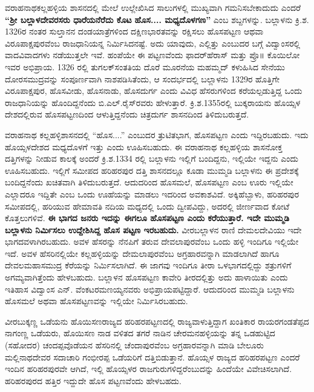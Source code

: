 \newpage

ವರಾಹನಾಥಕಲ್ಲಹಳ್ಳಿಯ ಶಾಸನದಲ್ಲಿ ಮೇಲೆ ಉಲ್ಲೇಖಿಸಿದ ಸಾಲುಗಳಲ್ಲಿ ಮುಖ್ಯವಾಗಿ ಗಮನಿಸಬೇಕಾದುದು ಎಂದರೆ \textbf{“ಶ‍್ರೀ ಬಲ್ಲಾಳದೇವರಸರು ಧಾರೆಯನೆರೆದು ಕೊಟ} \textbf{ಹೊಸ.... ಮಧ್ಯದೊಳಗಣ” }ಎಂಬ ಶಬ್ದಗಳನ್ನು. ಬಲ್ಲಾಳನು ಕ್ರಿ.ಶ. 1326ರ ನಂತರ ಸುಲ್ತಾನನ ದಂಡಯಾತ್ರೆಗಳಿಂದ ದಕ್ಷಿಣಭಾರತವನ್ನು ರಕ್ಷಿಸಲು ಹೊಸಪಟ್ಟಣ ಆಥವಾ ವಿರೂಪಾಕ್ಷಪುರ\-ವೆಂಬ ರಾಜಧಾನಿಯನ್ನ ನಿರ್ಮಿಸಿದನಷ್ಟೆ. ಅದು ಯಾವುದು, ಎಲ್ಲಿತ್ತು ಎಂಬುದರ ಬಗ್ಗೆ ವಿದ್ವಾಂಸರಲ್ಲಿ ವಾದವಿವಾದಗಳು ನಡೆಯುತ್ತಲೇ ಇವೆ. ಹಂಪೆಯೇ ಈ ಪಟ್ಟಣವೆಂದು ಫಾದರ್​ಹೆರಾಸ್​ ಮತ್ತು ಪ್ರೊ॥ ಕೊಯಿಲೋ ಇವರ ಅಭಿಪ್ರಾಯ. 1326 ರಲ್ಲಿ ತುಗಲಕ್​ ಸಂತತಿಯ ದೊರೆ ಮೂರನೆಯ ಮಹಮ್ಮದ್​ ಕಳುಹಿಸಿದ ಸೇನೆಯು ದೋರಸಮುದ್ರವನ್ನು ಸಂಪೂರ್ಣವಾಗಿ ನಾಶಪಡಿಸಿತೆಂದು, ಆ ಸಂದರ್ಭದಲ್ಲಿ ಬಲ್ಲಾಳನು 1329ರ ಹೊತ್ತಿಗೇ ವಿರೂಪಾಕ್ಷಪುರ, ಹೊಸವೀಡು, ಹೊಸನಾಡು, ಹೊಸದುರ್ಗ ಎಂದು ವಿವಿಧ ಹೆಸರುಗಳಿಂದ ಕರೆಯಲ್ಪಡುತ್ತಿದ್ದ ಒಂದು ರಾಜಧಾನಿಯನ್ನು ಹೊಂದಿದ್ದನೆಂದು ಬಿ.ಎಲ್​.ರೈಸ್​\-ರವರು ಹೇಳುತ್ತಾರೆ. ಕ್ರಿ.ಶ.1355ರಲ್ಲಿ ಬುಕ್ಕರಾಯನು ಹೊಯ್ಸಳ ದೇಶದಲ್ಲಿರುವ ಹೊಸಪಟ್ಟಣದಿಂದ ಆಳುತ್ತಿದ್ದನೆಂದು ಚಿತ್ರದುರ್ಗ ಶಾಸನದಿಂದ ತಿಳಿದುಬರುತ್ತದೆ.

ವರಾಹನಾಥ ಕಲ್ಲಹಳ್ಳಿಶಾಸನದಲ್ಲಿ “ಹೊಸ....” ಎಂಬುದರ ತ್ರುಟಿತಭಾಗ, ಹೊಸಪಟ್ಟಣ ಎಂದು ಇದ್ದಿರಬಹುದು. ಇದು ಹೊಯ್ಸಳದೇಶದ ಮಧ್ಯದೊಳಗೆ ಇತ್ತು ಎಂದು ಊಹಿಸಬಹುದು. ಈ ವರಾಹನಾಥ ಕಲ್ಲಹಳ್ಳಿಯ ಶಾಸನೋಕ್ತ ದತ್ತಿಗಳನ್ನು ನೀಡುವ ಕಾಲಕ್ಕೆ ಅಂದರೆ ಕ್ರಿ.ಶ.1334 ರಲ್ಲಿ ಬಲ್ಲಾಳನು ಇಲ್ಲಿಗೆ ಬಂದಿದ್ದನು, ಇಲ್ಲಿಯೇ ಇದ್ದನು ಎಂದು ಊಹಿಸಬಹುದು. ಇಲ್ಲಿಗೆ ಸಮೀಪದ ಹರಿಹರಪುರ ದತ್ತಿ ಶಾಸನದಲ್ಲೂ ಕೂಡಾ ಮುಮ್ಮಡಿ ಬಲ್ಲಾಳನು ಈ ಪ್ರದೇಶಕ್ಕೆ ಬಂದಿದ್ದನೆಂದು ಖಚಿತವಾಗಿ ತಿಳಿದುಬರುತ್ತದೆ. ಆದುದರಿಂದ ಹೊಸಮಲೆ, ಹೊಸಪಟ್ಟಣ ಎಂಬ ಊರು ಇಲ್ಲಿಯೇ ಎಲ್ಲಾದರೂ ಇದ್ದಿತೇ ಎಂಬ ಒಂದು ಊಹೆಯನ್ನು ಮಾಡಲು ಇದರಿಂದ ಅವಕಾಶವಿದೆ. ಅಕ್ಕಿಹೆಬ್ಬಾಳು, ಹರಿಹರಪುರ ಸಮೀಪದಲ್ಲಿ, ಹರಿಯುವ ಹೇಮಾವತಿ ನದಿಯ ಮಧ್ಯದಲ್ಲಿ ಒಂದು ದ್ವೀಪವಿದ್ದು, ಅದರಲ್ಲಿ ಜೀರ್ಣವಾದ ಕೋಟೆ ಕೊತ್ತಲುಗಳಿವೆ. \textbf{ಈ ಭಾಗದ ಜನರು ಇದನ್ನು ಈಗಲೂ ಹೊಸಪಟ್ಟಣ ಎಂದು ಕರೆಯುತ್ತಾರೆ. ಇದೇ ಮುಮ್ಮಡಿ ಬಲ್ಲಾಳನು ನಿರ್ಮಿಸಲು ಉದ್ದೇಶಿಸಿದ್ದ ಹೊಸ ಪಟ್ಟಣ ಇರಬಹುದು.} ವೀರಬಲ್ಲಾಳನ ರಾಣಿ ದೇಮಲದೇವಿಯು ಇದೇ ಭಾಗದವಳಾಗಿರಬಹುದು. ಅವಳ ಹೆಸರನ್ನು ನೆನಪಿಗೆ ತರುವ ದೇವಲಾಪುರವೆಂಬ ಒಂದು ಹಳ್ಳಿ ಇಂದಿಗೂ ಇಲ್ಲಿಯೇ ಇದೆ. ಅವಳ ಹೆಸರಿನಲ್ಲಿಯೇ ಕಲ್ಲಹಳ್ಳಿಯನ್ನು ದೇಮಲಾಪುರವೆಂಬ ಅಗ್ರಹಾರವನ್ನಾಗಿ ಮಾಡಲಾಗಿದೆ ಹಾಗೂ ದೇವಲಮಹಾಸಮುದ್ರ ಕೆರೆಯನ್ನು ನಿರ್ಮಿಸಲಾಗಿದೆ. ಈ ಜಾಗವು ಇಂದಿಗೂ ತೀರಾ ಒಳಭಾಗದಲ್ಲಿದ್ದು ಶತ್ರುಗಳಿಗೆ ಅಗಮ್ಯವಾಗಿತ್ತೆಂದು ಹೇಳಬಹುದು. ಬಲ್ಲಾಳನ ಹೊಸಪಟ್ಟಣ ಕಾವೇರಿ ತೀರದಲ್ಲಿತ್ತು ಅದು ಹಾಳಾಯಿತು ಎಂದು ಇತಿಹಾಸ ವಿದ್ವಾಂಸ ಎನ್​. ವೆಂಕಟರಮಣಯ್ಯನವರು ಅಭಿಪ್ರಾಯಪಟ್ಟಿದ್ದಾರೆ. ಆದುದರಿಂದ ಮುಮ್ಮಡಿ ಬಲ್ಲಾಳನು ಹೊಸಮಲೆ ಅಥವಾ ಹೊಸಪಟ್ಟಣವನ್ನು ಇಲ್ಲಿಯೇ ನಿರ್ಮಿಸಿರಬಹುದು.

ವೀರಬುಕ್ಕಣ್ಣ ಒಡೆಯನು ಹೊಯಿಸಣರಾಜ್ಯದ ಹರಿಹರಪಟ್ಟಣದಲ್ಲಿ ರಾಜ್ಯವಾಳುತ್ತಿದ್ದಾಗ ಖಂತಿಕಾರ ರಾಯರಗಂಡ\break ತೆಪ್ಪದ ನಾಗಂಣ್ಣ ಒಡೆಯರು, ಹೊಯಿಸಣ ನಾಡ ವಳಿತದ ತಗರೆ ನಾಡಿನ ಚೇರಮನಹಳ್ಳಿಯನ್ನು ತನ್ನ ಒಡಹುಟ್ಟಿದ (ಸಹೋದರ) ಚಂದಪ್ಪವೊಡೆಯನ ಹೆಸರಿನಲ್ಲಿ ಚೆಂದಾಪುರವೆಂಬ ಅಗ್ರಹಾರವನ್ನಾಗಿ ಮಾಡಿ ಬೇಲೂರು ಮಲ್ಲಿನಾಥದೇವರ ಸದಾಚಾರಿ ಗಂಭೀರಪ್ಪ ಒಡೆಯರಿಗೆ ದತ್ತಿಬಿಡುತ್ತಾನೆ. ಹೊಯ್ಸಳ ರಾಜ್ಯದ ಹರಿಹರಪಟ್ಟಣ ಎಂದರೆ ಇಂದಿನ ಹರಿಹರಪುರವೇ ಆಗಿದೆ, ಇಲ್ಲಿ ಹೊಯ್ಸಳರ ರಾಜಗುರುಗಳಿದ್ದರೆಂಬುದನ್ನು ಹಿಂದೆಯೇ ವಿವೇಚಿಸಲಾಗಿದೆ. ಹರಿಹರಪುರದ ಹತ್ತಿರ ಇದ್ದುದೇ ಹೊಸ ಪಟ್ಟಣವೆಂದು ಹೇಳಬಹದು.

